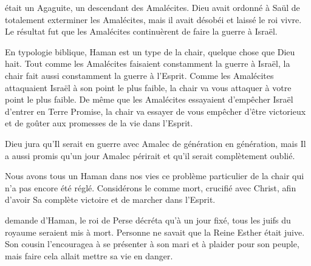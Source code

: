  était un Agaguite, un descendant des Amalécites.
 Dieu avait ordonné à Saül de totalement exterminer les Amalécites,
 mais il avait désobéi et laissé le roi vivre.
 Le résultat fut que les Amalécites continuèrent de faire la guerre à Israël.

En typologie
 biblique, Haman est un type de la chair,
 quelque chose que Dieu hait.
 Tout comme les Amalécites faisaient constamment la guerre à Israël,
 la chair fait aussi constamment la guerre à l'Esprit.
 Comme les Amalécites attaquaient Israël à son point le plus faible,
 la chair va vous attaquer à votre point le plus faible.
 De même que les Amalécites essayaient d'empêcher Israël
 d'entrer en Terre Promise, la chair va essayer de vous empêcher
 d'être victorieux et de goûter aux promesses de la vie dans l'Esprit.

Dieu jura qu'Il serait en guerre avec Amalec de génération en génération,
 mais Il a aussi promis qu'un jour Amalec périrait et
 qu'il serait complètement oublié.


Nous avons tous un Haman dans nos vies
 \ocadr{}ce problème particulier de la chair
 qui n'a pas encore été réglé.
 Considérons le comme mort, crucifié avec Christ,
 afin d'avoir Sa complète victoire et de marcher dans l'Esprit.

\dvrule







 demande d'Haman, le roi de Perse décréta qu'à un jour fixé,
 tous les juifs du royaume seraient mis à mort.
 Personne ne savait que la Reine Esther était juive.
 Son cousin l'encouragea à se présenter à son mari et à plaider pour son peuple,
 mais faire cela allait mettre sa vie en danger.

